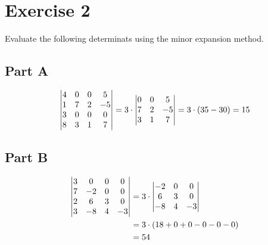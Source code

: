 \section*{Exercise 2}

Evaluate the following determinats using the minor expansion method. 

\subsection*{Part A}

\[
	\genericmat{v}{
		4&0&0&5\\
		1&7&2&-5\\
		3&0&0&0\\
		8&3&1&7
	} = 
	3 \cdot 
	\genericmat{v}{
		0&0&5\\
		7&2&-5\\
		3&1&7
	} = 
	3 \cdot (35 - 30) = 15
\]

\subsection*{Part B}

\[
	\begin{aligned}
	\genericmat{v}{
		3 & 0 & 0 & 0\\
 		7 & -2 & 0 & 0\\
 		2 & 6 & 3 & 0\\
 		3 & -8 & 4 & -3
	} &= 3 \cdot
	\genericmat{v}{
		-2 & 0 & 0 \\
		6 & 3 & 0 \\
		-8 & 4 & -3
	} \\
	&=
	3 \cdot (18 + 0 + 0 - 0 - 0 - 0) \\
	&= 54
	\end{aligned}
\]
